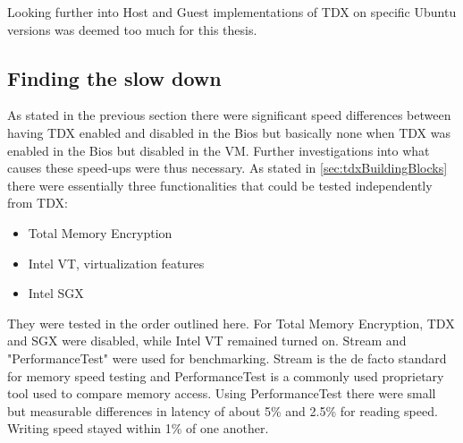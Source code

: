 Looking further into Host and Guest implementations of TDX on specific Ubuntu versions was deemed too much for this thesis.

\subsection{Finding the slow down}

As stated in the previous section there were significant speed differences between having TDX enabled and disabled in the Bios but basically none when TDX was enabled in the Bios but disabled in the VM. Further investigations into what causes these speed-ups were thus necessary. As stated in \ref{sec:tdxBuildingBlocks} there were essentially three functionalities that could be tested independently from TDX:
\begin{itemize}
    \item Total Memory Encryption 
    \item Intel VT, virtualization features
    \item Intel SGX
\end{itemize}

They were tested in the order outlined here.
For Total Memory Encryption, TDX and SGX were disabled, while Intel VT remained turned on. Stream \cite{StreamPaper} and "PerformanceTest" \cite{PerformanceTest} were used for benchmarking. Stream is the de facto standard for memory speed testing and PerformanceTest is a commonly used proprietary tool used to compare memory access. Using PerformanceTest there were small but measurable differences in latency of about 5\% and 2.5\% for reading speed. Writing speed stayed within 1\% of one another.
\begin{table}
\centering
{}
\caption{Results of Performancetests memory benchmark}
\label{tab:MemoryAccessSpeed}
\end{table}

